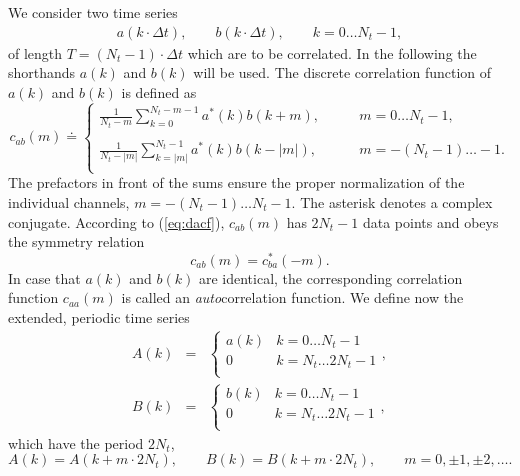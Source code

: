 \documentclass[a4paper,11pt]{article}
\begin{document}
\begin{appendices}
We consider two time series
\begin{eqnarray}
a(k\cdot\Delta t),\qquad b(k\cdot\Delta t), \qquad k = 0\ldots N_t-1, 
\end{eqnarray}
of length $T = (N_t-1)\cdot\Delta t$ which are to be correlated. In the
following the shorthands $a(k)$ and $b(k)$ will be used. The discrete
correlation function of $a(k)$ and $b(k)$ is defined as
\begin{equation}
\label{eq:dacf}
c_{ab}(m) \doteq \left\{
\begin{array}{ll}
\frac{1}{N_t - m}\sum_{k=0}^{N_t-m-1}a^*(k)b(k+m),
                 \qquad &m= 0\ldots N_t-1,\\
&\\
\frac{1}{N_t - |m|}\sum_{k=|m|}^{N_t-1}a^*(k)b(k-|m|),
                 \qquad &m= -(N_t-1)\ldots -1.\\
\end{array} \right.
\end{equation}
The prefactors in front of the sums ensure the proper normalization of
the individual channels, $m = -(N_t-1)\ldots N_t-1$.  The asterisk
denotes a complex conjugate. According to (\ref{eq:dacf}),
$c_{ab}(m)$ has $2N_t - 1$ data points and obeys the symmetry relation
\begin{equation}
c_{ab}(m) = c^*_{ba}(-m).
\end{equation}
In case that $a(k)$ and $b(k)$ are identical, the corresponding
correlation function $c_{aa}(m)$ is called an \textit{auto}correlation
function. We define now the extended, periodic time series
\begin{eqnarray}
\label{eq:a}
A(k) &= &\left\{\begin{array}{ll}
                a(k) &k = 0\ldots N_t-1\\
                0    &k = N_t \ldots 2N_t-1\\
                \end{array}\right.,\\
\label{eq:b}
B(k) &= &\left\{\begin{array}{ll}
                b(k) &k = 0\ldots N_t-1\\
                0    &k = N_t \ldots 2N_t-1\\
                \end{array}\right.,
\end{eqnarray}
which have the period $2N_t$,
\begin{equation}
A(k) = A(k + m\cdot 2N_t),\qquad
B(k) = B(k + m\cdot 2N_t),\qquad m = 0,\pm 1,\pm 2,\ldots.
\end{equation}

\end{appendices}
\end{document}
